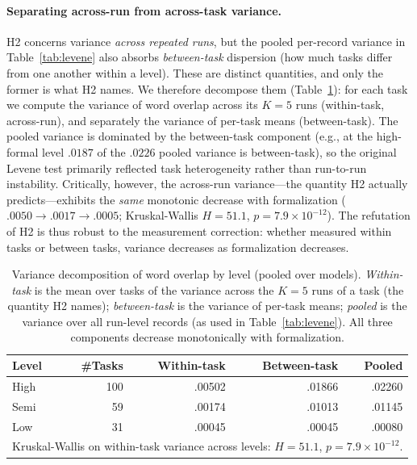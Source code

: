 \documentclass[runningheads]{llncs}
\begin{document}
\paragraph{Separating across-run from across-task variance.}
H2 concerns variance \emph{across repeated runs}, but the pooled per-record variance in Table~\ref{tab:levene} also absorbs \emph{between-task} dispersion (how much tasks differ from one another within a level). These are distinct quantities, and only the former is what H2 names. We therefore decompose them (Table~\ref{tab:variance-decomp}): for each task we compute the variance of word overlap across its $K\!=\!5$ runs (within-task, across-run), and separately the variance of per-task means (between-task). The pooled variance is dominated by the between-task component (e.g., at the high-formal level $.0187$ of the $.0226$ pooled variance is between-task), so the original Levene test primarily reflected task heterogeneity rather than run-to-run instability. Critically, however, the across-run variance---the quantity H2 actually predicts---exhibits the \emph{same} monotonic decrease with formalization ($.0050 \to .0017 \to .0005$; Kruskal-Wallis $H\!=\!51.1$, $p\!=\!7.9\times10^{-12}$). The refutation of H2 is thus robust to the measurement correction: whether measured within tasks or between tasks, variance decreases as formalization decreases.

\begin{table}[ht]
\centering
\caption{Variance decomposition of word overlap by level (pooled over models). \emph{Within-task} is the mean over tasks of the variance across the $K\!=\!5$ runs of a task (the quantity H2 names); \emph{between-task} is the variance of per-task means; \emph{pooled} is the variance over all run-level records (as used in Table~\ref{tab:levene}). All three components decrease monotonically with formalization.}
\label{tab:variance-decomp}
\setlength{\tabcolsep}{7pt}
\begin{tabular}{lrrrr}
\toprule
Level & \#Tasks & Within-task & Between-task & Pooled \\
\midrule
High & 100 & .00502 & .01866 & .02260 \\
Semi &  59 & .00174 & .01013 & .01145 \\
Low  &  31 & .00045 & .00045 & .00080 \\
\bottomrule
\multicolumn{5}{l}{\scriptsize Kruskal-Wallis on within-task variance across levels: $H\!=\!51.1$, $p\!=\!7.9\times10^{-12}$.}
\end{tabular}
\end{table}
\end{document}
